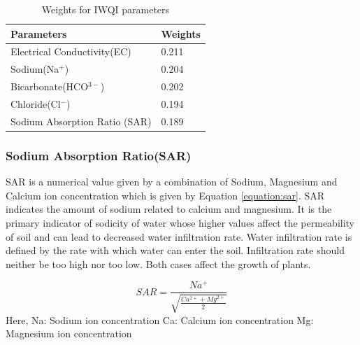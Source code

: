 \begin{table}[h!]
    \centering
    \begin{tabular}{|l|l|}
    \hline
        \textbf{Parameters} & \textbf{Weights} \\ \hline
        Electrical Conductivity(EC) & 0.211 \\ \hline
        Sodium(Na$^+$) & 0.204 \\ \hline
        Bicarbonate(HCO$^{3-}$) & 0.202 \\ \hline
        Chloride(Cl$^-$) & 0.194 \\ \hline
        Sodium Absorption Ratio (SAR) & 0.189 \\ \hline
    \end{tabular}
    \caption{Weights for IWQI parameters}
    \label{table:wqiParams}
\end{table}

\subsubsection{Sodium Absorption Ratio(SAR)}
\label{subsubsection:sar}
SAR is a numerical value given by a combination of Sodium, Magnesium and Calcium ion concentration which is given by Equation \ref{equation:sar}. SAR indicates the amount of sodium related to calcium and magnesium. It is the primary indicator of sodicity of water whose higher values affect the permeability of soil and can lead to decreased water infiltration rate\cite{book:waterQualityAgri}. Water infiltration rate is defined by the rate with which water can enter the soil. Infiltration rate should neither be too high nor too low. Both cases affect the growth of plants. 

\begin{equation}
\label{equation:sar}
    SAR = \frac{Na^+}{\sqrt{\frac{Ca^{2+} + Mg^{2+}}{2}}} 
\end{equation}
Here, \newline
Na: Sodium ion concentration \newline
Ca: Calcium ion concentration \newline
Mg: Magnesium ion concentration \newline

